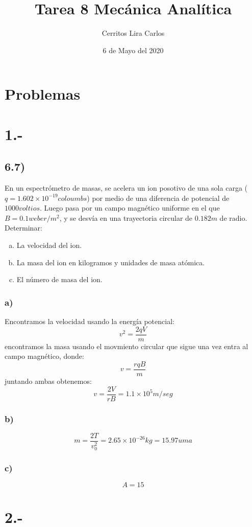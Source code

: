 \documentclass{article}
\title{Tarea 8 Mecánica Analítica}
\author{Cerritos Lira Carlos}
\date{6 de Mayo del 2020}
\begin{document}
\maketitle
\section*{Problemas}
\section*{1.-}
\subsection*{6.7)}
En un espectrómetro de masas, se acelera un ion posotivo de una sola carga 
($q=1.602 \times 10^{-19} coloumbs$) por medio de una diferencia de potencial de 
$1000 voltios$. Luego pasa por un campo magnético uniforme en el que $B=0.1weber/m^2$,
y se desvía en una trayectoria circular de $0.182m$ de radio. Determinar:
\begin{enumerate}[a)]
    \item La velocidad del ion.
    \item La masa del ion en kilogramos y unidades de masa atómica.
    \item El número de masa del ion.
\end{enumerate}
\begin{tcolorbox}[breakable]
    \subsubsection*{a)}
    Encontramos la velocidad usando la energía potencial:
    \[ v^2 = \frac{2qV}{m} \]
    encontramos la masa usando el movmiento circular que sigue una vez entra al campo magnético, donde:
    \[ v = \frac{rqB}{m} \]
    juntando ambas obtenemos:
    \[ v = \frac{2V}{rB} = 1.1 \times 10^5 m/seg\]
    \subsubsection*{b)}
    \[ m = \frac{2T}{v_0^2} = 2.65 \times 10^{-26}kg = 15.97uma\]
    \subsubsection*{c)}
    \[ A = 15 \]
\end{tcolorbox}

\section*{2.-}
\end{document}
